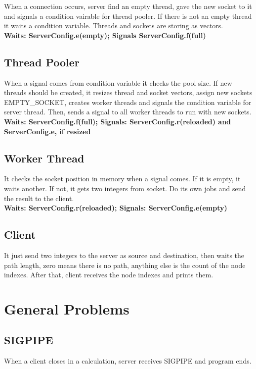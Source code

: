 \documentclass[11pt]{scrartcl} %
\begin{document}
When a connection occurs, server find an empty thread, gave the new socket to it and signals a condition vairable for thread pooler. If there is not an empty thread it waits a condition variable. Threads and sockets are storing as vectors.
\\ \textbf{Waits: ServerConfig.e(empty); Signals ServerConfig.f(full)}

\subsection{Thread Pooler}

When a signal comes from condition variable it checks the pool size. If new threads should be created, it resizes thread and socket vectors, assign new sockets EMPTY\_SOCKET, creates worker threads and signals the condition variable for server thread. Then, sends a signal to all worker threads to run with new sockets. 
\\ \textbf{Waits: ServerConfig.f(full); Signals: ServerConfig.r(reloaded) and ServerConfig.e, if resized}

\subsection{Worker Thread}

It checks the socket position in memory when a signal comes. If it is empty, it waits another. If not, it gets two integers from socket. Do its own jobs and send the result to the client.
\\ \textbf{Waits: ServerConfig.r(reloaded); Signals: ServerConfig.e(empty)}

\subsection{Client}

It just send two integers to the server as source and destination, then waits the path length, zero means there is no path, anything else is the count of the node indexes. After that, client receives the node indexes and prints them.

\section{General Problems}

\subsection{SIGPIPE}
When a client closes in a calculation, server receives SIGPIPE and program ends.
\end{document}
